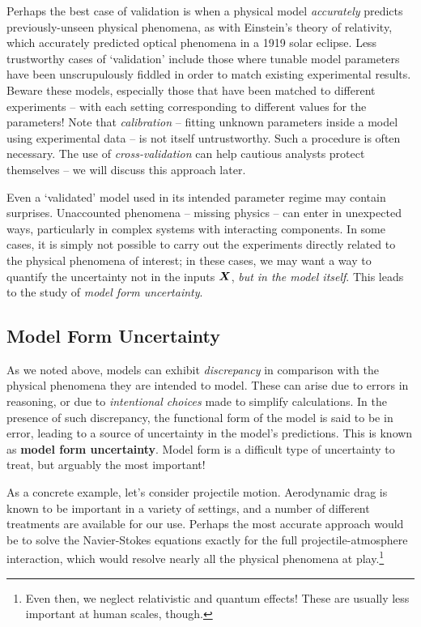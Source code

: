 \documentclass[../primer.tex]{subfiles}
\begin{document}
Perhaps the best case of validation is when a physical model \emph{accurately}
predicts previously-unseen physical phenomena, as with Einstein's theory of
relativity, which accurately predicted optical phenomena in a 1919 solar
eclipse. Less trustworthy cases of `validation' include those where tunable
model parameters have been unscrupulously fiddled in order to match existing
experimental results. Beware these models, especially those that have been
matched to different experiments -- with each setting corresponding to different
values for the parameters! Note that \emph{calibration} -- fitting unknown
parameters inside a model using experimental data -- is not itself
untrustworthy. Such a procedure is often necessary. The use of
\emph{cross-validation} can help cautious analysts protect themselves -- we will
discuss this approach later.

Even a `validated' model used in its intended parameter regime may contain
surprises. Unaccounted phenomena -- missing physics -- can enter in unexpected
ways, particularly in complex systems with interacting components. In some
cases, it is simply not possible to carry out the experiments directly related
to the physical phenomena of interest; in these cases, we may want a way to
quantify the uncertainty not in the inputs $\boldsymbol{X}$, \emph{but in the model
  itself}. This leads to the study of \emph{model form uncertainty}.

\subsection{Model Form Uncertainty}
As we noted above, models can exhibit \emph{discrepancy} in comparison with the
physical phenomena they are intended to model. These can arise due to errors in
reasoning, or due to \emph{intentional choices} made to simplify calculations.
In the presence of such discrepancy, the functional form of the model is said to
be in error, leading to a source of uncertainty in the model's predictions. This
is known as \textbf{model form uncertainty}. Model form is a difficult type of
uncertainty to treat, but arguably the most important!

As a concrete example, let's consider projectile motion. Aerodynamic drag is
known to be important in a variety of settings, and a number of different
treatments are available for our use. Perhaps the most accurate approach would
be to solve the Navier-Stokes equations exactly for the full
projectile-atmosphere interaction, which would resolve nearly all the physical
phenomena at play.\footnote{Even then, we neglect relativistic and quantum
  effects! These are usually less important at human scales, though.}
\end{document}
